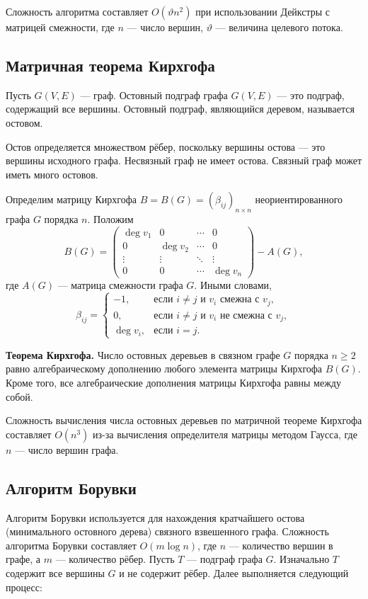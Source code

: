 Сложность алгоритма составляет $O(\vartheta n^2)$ при использовании Дейкстры с матрицей смежности, где $n$ — число вершин, $\vartheta$ — величина целевого потока.

\subsection{Матричная теорема Кирхгофа}

Пусть \( G(V, E) \) — граф. Остовный подграф графа \( G(V, E) \) — это подграф, содержащий все вершины. Остовный подграф, являющийся деревом, называется остовом.

Остов определяется множеством рёбер, поскольку вершины остова — это вершины исходного графа. Несвязный граф не имеет остова. Связный граф может иметь много остовов.

Определим матрицу Кирхгофа \( B = B(G) = (\beta_{ij})_{n \times n} \) неориентированного графа \( G \) порядка \( n \). Положим
\[
B(G) = 
\begin{pmatrix}
	\deg v_1 & 0 & \cdots & 0 \\
	0 & \deg v_2 & \cdots & 0 \\
	\vdots & \vdots & \ddots & \vdots \\
	0 & 0 & \cdots & \deg v_n
\end{pmatrix} - A(G),
\]
где \( A(G) \) — матрица смежности графа \( G \). Иными словами,
\[
\beta_{ij} =
\begin{cases} 
	-1, & \text{если } i \neq j \text{ и } v_i \text{ смежна с } v_j, \\
	0, & \text{если } i \neq j \text{ и } v_i \text{ не смежна с } v_j, \\
	\deg v_i, & \text{если } i = j.
\end{cases}
\]

\textbf{Теорема Кирхгофа.}  
Число остовных деревьев в связном графе \( G \) порядка \( n \geq 2 \) равно алгебраическому дополнению любого элемента матрицы Кирхгофа \( B(G) \). Кроме того, все алгебраические дополнения матрицы Кирхгофа равны между собой.

Сложность вычисления числа остовных деревьев по матричной теореме Кирхгофа составляет $O(n^3)$ из-за вычисления определителя матрицы методом Гаусса, где $n$ — число вершин графа.

\subsection{Алгоритм Борувки}
Алгоритм Борувки используется для нахождения кратчайшего остова (минимального остовного дерева) связного взвешенного графа. Сложность алгоритма Борувки составляет $O(m\log{n})$, где $n$ — количество вершин в графе, а $m$ — количество рёбер. Пусть \(T\) — подграф графа \(G\). Изначально \(T\) содержит все вершины \(G\) и не содержит рёбер. Далее выполняется следующий процесс:


